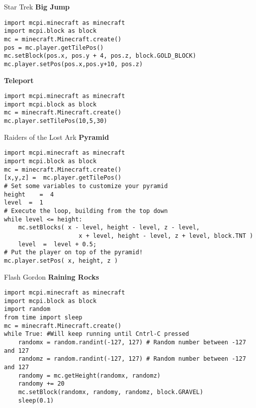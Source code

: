 \documentclass[flashcard_land,grid]{flashcards}
\begin{document}
\begin{flashcard}[API]{Star Trek}
{\bf Big Jump}
\begin{lstlisting}
import mcpi.minecraft as minecraft
import mcpi.block as block
mc = minecraft.Minecraft.create()
pos = mc.player.getTilePos()
mc.setBlock(pos.x, pos.y + 4, pos.z, block.GOLD_BLOCK)
mc.player.setPos(pos.x,pos.y+10, pos.z) 
\end{lstlisting}

{\bf Teleport}
\begin{lstlisting}
import mcpi.minecraft as minecraft
import mcpi.block as block
mc = minecraft.Minecraft.create()
mc.player.setTilePos(10,5,30)
\end{lstlisting}
\end{flashcard}


\begin{flashcard}[API]{Raiders of the Lost Ark}
{\bf Pyramid}
\begin{lstlisting}
import mcpi.minecraft as minecraft
import mcpi.block as block
mc = minecraft.Minecraft.create()
[x,y,z] =  mc.player.getTilePos()
# Set some variables to customize your pyramid
height    =  4
level  =  1
# Execute the loop, building from the top down
while level <= height:
	mc.setBlocks( x - level, height - level, z - level,
	                 x + level, height - level, z + level, block.TNT )
	level  =  level + 0.5;
# Put the player on top of the pyramid!
mc.player.setPos( x, height, z )
\end{lstlisting}
\end{flashcard}

\begin{flashcard}[API]{Flash Gordon}
{\bf Raining Rocks}
\begin{lstlisting}
import mcpi.minecraft as minecraft
import mcpi.block as block
import random
from time import sleep
mc = minecraft.Minecraft.create()
while True: #Will keep running until Cntrl-C pressed
    randomx = random.randint(-127, 127) # Random number between -127 and 127
    randomz = random.randint(-127, 127) # Random number between -127 and 127
    randomy = mc.getHeight(randomx, randomz)
    randomy += 20
    mc.setBlock(randomx, randomy, randomz, block.GRAVEL)
    sleep(0.1)
\end{lstlisting}
\end{flashcard}
\end{document}
